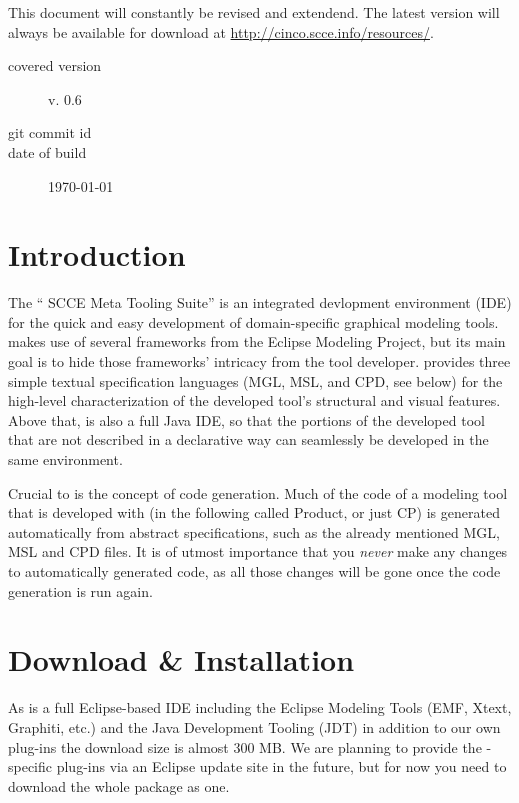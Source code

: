 \documentclass[a4paper,american,12pt]{scrreprt}
\begin{document}
This document will constantly be revised and extendend. The latest version will
always be available for download at \url{http://cinco.scce.info/resources/}. 

\begin{description}
\item[covered version] \cinco v. 0.6
\item[git commit id] \gitAbbrevHash{}
\item[date of build] \today
\end{description}

\section{Introduction}

The ``\cinco{} SCCE Meta Tooling Suite'' is an integrated devlopment environment
(IDE) for the quick and easy development of domain-specific graphical modeling
tools. \cinco{} makes use of several frameworks from the Eclipse Modeling
Project, but its main goal is to hide those frameworks' intricacy from the
tool developer. \cinco{} provides three simple textual specification languages (MGL,
MSL, and CPD, see below) for the high-level characterization of the developed tool's
structural and visual features. Above that, \cinco{} is also a full Java IDE, so
that the portions of the developed tool that are not described in a declarative
way can seamlessly be developed in the same environment.

Crucial to \cinco is the concept of code generation. Much of the code of a
modeling tool that is developed with \cinco (in the following called \cinco
Product, or just CP) is generated automatically from abstract specifications,
such as the already mentioned MGL, MSL and CPD files. It is of utmost importance
that you \emph{never} make any changes to automatically generated
code\footnotemark{}, as all those changes will be gone once the code generation
is run again.


\section{Download \& Installation}

As \cinco{} is a full Eclipse-based IDE including the Eclipse Modeling Tools
(EMF, Xtext, Graphiti, etc.) and the Java Development Tooling (JDT) in addition
to our own plug-ins the download size is almost 300 MB. We are planning to
provide the \cinco{}-specific plug-ins via an Eclipse update site in the future,
but for now you need to download the whole package as one.
\end{document}
